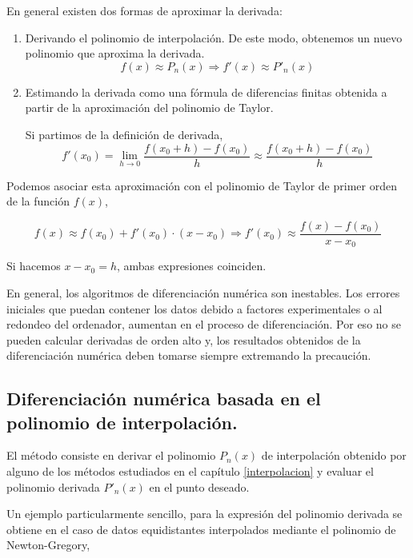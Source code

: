 En general existen dos formas de aproximar la derivada:

\begin{enumerate}
\item Derivando el polinomio de interpolación. De este modo, obtenemos un nuevo polinomio que aproxima la derivada.
\begin{equation*}
f(x)\approx P_n(x) \Rightarrow f'(x) \approx P'_n(x)
\end{equation*}

\item Estimando la derivada como una fórmula de diferencias finitas obtenida a partir de la aproximación del polinomio de Taylor. 

Si partimos de la definición de derivada, 
\begin{equation*}
f'(x_0)=\lim_{h\rightarrow 0}\frac{f(x_0+h)-f(x_0)}{h} \approx \frac{f(x_0+h)-f(x_0)}{h} 
\end{equation*}
\end{enumerate}

Podemos asociar esta aproximación con el polinomio de Taylor de primer orden de la función $f(x)$,

\begin{equation*}
f(x)\approx f(x_0)+f'(x_0)\cdot(x-x_0) \Rightarrow f'(x_0)\approx \frac{f(x)-f(x_0)}{x-x_0}
\end{equation*}

Si hacemos $x-x_0=h$, ambas expresiones coinciden.
 
En general, los algoritmos de diferenciación numérica son inestables. Los errores iniciales que puedan contener los datos debido a factores experimentales o al redondeo del ordenador, aumentan en el proceso de diferenciación. Por eso no se pueden calcular derivadas de orden alto y, los resultados obtenidos de la diferenciación numérica deben tomarse siempre extremando la precaución.

\subsection{Diferenciación numérica basada en el polinomio de interpolación.}

El método consiste en derivar el polinomio $P_n(x)$ de interpolación obtenido por alguno de los métodos estudiados en el capítulo \ref{interpolacion} y evaluar el polinomio derivada $P'_n(x)$ en el punto deseado.

Un ejemplo particularmente sencillo, para la expresión del polinomio derivada se obtiene  en el caso de datos equidistantes interpolados mediante el polinomio de Newton-Gregory,

